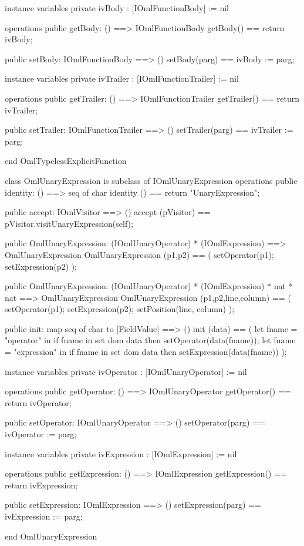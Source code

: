 \begin{vdm_al}
instance variables
  private ivBody : [IOmlFunctionBody] := nil

operations
  public getBody: () ==> IOmlFunctionBody
  getBody() == return ivBody;

  public setBody: IOmlFunctionBody ==> ()
  setBody(parg) == ivBody := parg;

instance variables
  private ivTrailer : [IOmlFunctionTrailer] := nil

operations
  public getTrailer: () ==> IOmlFunctionTrailer
  getTrailer() == return ivTrailer;

  public setTrailer: IOmlFunctionTrailer ==> ()
  setTrailer(parg) == ivTrailer := parg;

end OmlTypelessExplicitFunction
\end{vdm_al}

\begin{vdm_al}
class OmlUnaryExpression is subclass of IOmlUnaryExpression
operations
  public identity: () ==> seq of char
  identity () == return "UnaryExpression";

  public accept: IOmlVisitor ==> ()
  accept (pVisitor) == pVisitor.visitUnaryExpression(self);

  public OmlUnaryExpression:
    (IOmlUnaryOperator) *
    (IOmlExpression) ==> OmlUnaryExpression
  OmlUnaryExpression (p1,p2) == 
    ( setOperator(p1);
      setExpression(p2) );

  public OmlUnaryExpression:
    (IOmlUnaryOperator) *
    (IOmlExpression) *
    nat *
    nat ==> OmlUnaryExpression
  OmlUnaryExpression (p1,p2,line,column) == 
    ( setOperator(p1);
      setExpression(p2);
      setPosition(line, column) );

  public init: map seq of char to [FieldValue] ==> ()
  init (data) ==
    ( let fname = "operator" in
        if fname in set dom data
        then setOperator(data(fname));
      let fname = "expression" in
        if fname in set dom data
        then setExpression(data(fname)) );

instance variables
  private ivOperator : [IOmlUnaryOperator] := nil

operations
  public getOperator: () ==> IOmlUnaryOperator
  getOperator() == return ivOperator;

  public setOperator: IOmlUnaryOperator ==> ()
  setOperator(parg) == ivOperator := parg;

instance variables
  private ivExpression : [IOmlExpression] := nil

operations
  public getExpression: () ==> IOmlExpression
  getExpression() == return ivExpression;

  public setExpression: IOmlExpression ==> ()
  setExpression(parg) == ivExpression := parg;

end OmlUnaryExpression
\end{vdm_al}


